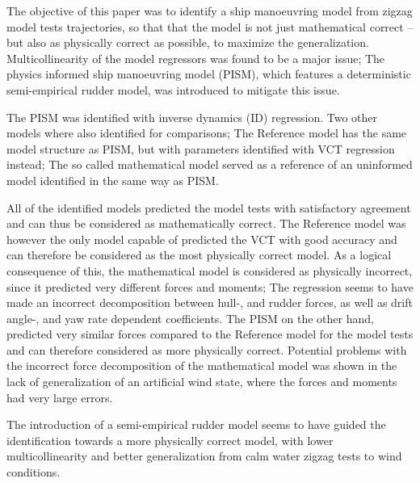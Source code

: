 The objective of this paper was to identify a ship manoeuvring model from zigzag model tests trajectories, so that that the model is not just mathematical correct -- but also as physically correct as possible, to maximize the generalization. Multicollinearity of the model regressors was found to be a major issue; The physics informed ship manoeuvring model (PISM), which features a deterministic semi-empirical rudder model, was introduced to mitigate this issue. 

The PISM was identified with inverse dynamics (ID) regression. Two other models where also identified for comparisons;
The Reference model has the same model structure as PISM, but with parameters identified with VCT regression instead; The so called mathematical model served as a reference of an uninformed model identified in the same way as PISM.

All of the identified models predicted the model tests with satisfactory agreement and can thus be considered as mathematically correct.
The Reference model was however the only model capable of predicted the VCT with good accuracy and can therefore be considered as the most physically correct model.
As a logical consequence of this, the mathematical model is considered as physically incorrect, since it predicted very different forces and moments; The regression seems to have made an incorrect decomposition between hull-, and rudder forces, as well as drift angle-, and yaw rate dependent coefficients.
The PISM on the other hand, predicted very similar forces compared to the Reference model for the model tests and can therefore considered as more physically correct.
Potential problems with the incorrect force decomposition of the mathematical model was shown in the lack of generalization of an artificial wind state, where the forces and moments had very large errors.

The introduction of a semi-empirical rudder model seems to have guided the identification towards a more physically correct model, with lower multicollinearity and better generalization from calm water zigzag tests to wind conditions.

